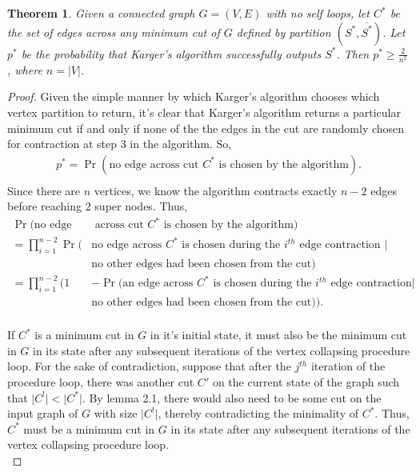\documentclass[psamsfonts, 10pt]{amsart}
\newtheorem{thm}{Theorem}[section]
\theoremstyle{definition}
\theoremstyle{remark}
\numberwithin{equation}{section}
\begin{document}
\begin{thm} Given a connected graph  $G = (V, E)$ with no self loops, let $C^*$ be the set of edges across any minimum cut of $G$ defined by partition $(S^*, \overline{S^*})$. Let $p^*$ be the probability that Karger's algorithm successfully outputs $S^*$. Then $p^* \geq \frac{2}{n^2}$, where $n = \lvert V \rvert$.
\end{thm}
\begin{proof}
Given the simple manner by which Karger's algorithm chooses which vertex partition to return, it's clear that Karger's algorithm returns a particular minimum cut if and only if none of the the edges in the cut are randomly chosen for contraction at step 3 in the algorithm. So, 
\begin{equation*}
\begin{aligned}
 p^*= \Pr(\text{no edge across cut }C^*\text{ is chosen by the algorithm}).\\
\end{aligned}
\end{equation*}
Since there are $n$ vertices, we know the algorithm contracts exactly $n-2$ edges before reaching 2 super nodes. Thus,
\begin{equation*}
\begin{aligned}
\Pr(\text{no edge}& \text{ across cut }C^*\text{ is chosen by the algorithm})\\
= \prod_{i=1}^{n-2} \Pr(&\text{no edge across } C^* \text{ is chosen  during the }i^{th} \text{ edge contraction } \lvert\\
&\text{no other edges had been chosen from the cut})\\
=\prod_{i=1}^{n-2} \bigg( 1& - \Pr(\text{an edge across } C^* \text{ is chosen  during the }i^{th} \text{ edge contraction} \lvert\\
&\text{no other edges had been chosen from the cut}) \bigg).\\
\end{aligned}
\end{equation*}

If $C^*$ is a minimum cut in $G$ in it's initial state, it must also be the minimum cut in $G$ in its state after any subsequent iterations of the vertex collapsing procedure loop. For the sake of contradiction, suppose that after the $j^{th}$ iteration of the procedure loop, there was another cut $C'$ on the current state of the graph such that $\lvert C^! \rvert < \lvert C^* \rvert$. By lemma 2.1, there would also need to be some cut on the input graph of $G$ with size $\lvert C^! \rvert$, thereby contradicting the minimality of $C^*$. Thus, $C^*$ must be a minimum cut in $G$ in its state after any subsequent iterations of the vertex collapsing procedure loop.\\


\end{proof}
\end{document}
